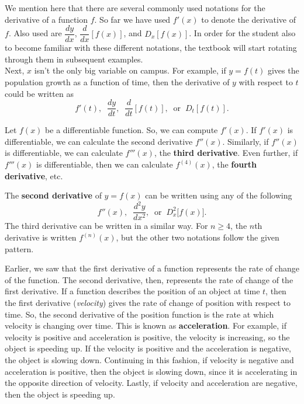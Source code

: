 \documentclass{book}
\begin{document}
We mention here that there are several commonly used notations for the derivative of a function $f$. So far we have used $f'(x)$ to denote the derivative of $f$. Also used are $\dfrac{dy}{dx}$, $\dfrac{d}{dx}[f(x)]$, and $D_x[f(x)]$. In order for the student also to become familiar with these different notations, the textbook will start rotating through them in subsequent examples.\\

Next, $x$ isn't the only big variable on campus. For example, if $y=f(t)$ gives the population growth as a function of time, then the derivative of $y$ with respect to $t$ could be written as 
\[f'(t),\; \;\dfrac{dy}{dt},\;\; \dfrac{d}{dt}[f(t)],\;\; \mbox{or}\;\; D_t[f(t)].\]

Let $f(x)$ be a differentiable function. So, we can compute $f'(x)$. If $f'(x)$ is differentiable, we can calculate the second derivative $f''(x)$. Similarly, if $f''(x)$ is differentiable, we can calculate $f'''(x)$, the \textbf{third derivative}. Even further, if $f'''(x)$ is differentiable, then we can calculate $f^{(4)}(x)$, the \textbf{fourth derivative}, etc.

\begin{Def} The \textbf{second derivative} of $y = f(x)$ can be written using any of the following
\[f''(x), \;\; \dfrac{d^2y}{dx^2}, \;\;\mbox{or}\;\; D^2_x\big[f(x)\big].\] The third derivative can be written in a similar way. For $n\ge 4$, the $n$th derivative is written $f^{(n)}(x)$, but the other two notations follow the given pattern.
\end{Def}\vs

Earlier, we saw that the first derivative of a function represents the rate of change of the function. The second derivative, then, represents the rate of change of the first derivative. If a function describes the position of an object at time $t$, then the first derivative (\emph{velocity}) gives the rate of change of position with respect to time. So, the second derivative of the position function is the rate at which velocity is changing over time. This is known as \textbf{acceleration}. For example, if velocity is positive and acceleration is positive, the velocity is increasing, so the object is speeding up. If the velocity is positive and the acceleration is negative, the object is slowing down. Continuing in this fashion, if velocity is negative and acceleration is positive, then the object is slowing down, since it is accelerating in the opposite direction of velocity. Lastly, if velocity and acceleration are negative, then the object is speeding up.\\
\end{document}
